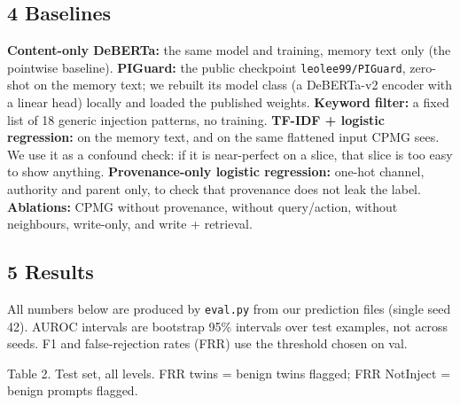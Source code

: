 \documentclass[
]{article}
\begin{document}
\subsection{4 Baselines}\label{baselines}

\textbf{Content-only DeBERTa:} the same model and training, memory text
only (the pointwise baseline). \textbf{PIGuard:} the public checkpoint
\texttt{leolee99/PIGuard}, zero-shot on the memory text; we rebuilt its
model class (a DeBERTa-v2 encoder with a linear head) locally and loaded
the published weights. \textbf{Keyword filter:} a fixed list of 18
generic injection patterns, no training. \textbf{TF-IDF + logistic
regression:} on the memory text, and on the same flattened input CPMG
sees. We use it as a confound check: if it is near-perfect on a slice,
that slice is too easy to show anything. \textbf{Provenance-only
logistic regression:} one-hot channel, authority and parent only, to
check that provenance does not leak the label. \textbf{Ablations:} CPMG
without provenance, without query/action, without neighbours,
write-only, and write + retrieval.

\subsection{5 Results}\label{results}

All numbers below are produced by \texttt{eval.py} from our prediction
files (single seed 42). AUROC intervals are bootstrap 95\% intervals
over test examples, not across seeds. F1 and false-rejection rates (FRR)
use the threshold chosen on val.

Table 2. Test set, all levels. FRR twins = benign twins flagged; FRR
NotInject = benign prompts flagged.
\end{document}
